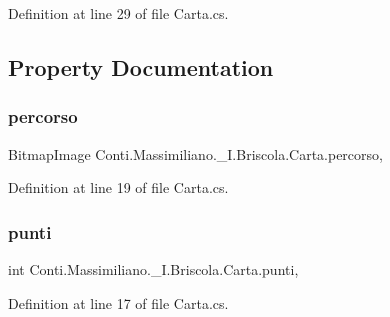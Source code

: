 Definition at line 29 of file Carta.\+cs.



\subsection{Property Documentation}
\hypertarget{class_conti_1_1_massimiliano_1_1__5_i_1_1_briscola_1_1_carta_a1320bde230f47bb50e716058ae0d11e9}{}\label{class_conti_1_1_massimiliano_1_1__5_i_1_1_briscola_1_1_carta_a1320bde230f47bb50e716058ae0d11e9} 
\subsubsection{\texorpdfstring{percorso}{percorso}}
{\footnotesize\ttfamily Bitmap\+Image Conti.\+Massimiliano.\+\_\+I.\+Briscola.\+Carta.\+percorso\hspace{0.3cm}{\ttfamily [get]}, {\ttfamily [set]}}



Definition at line 19 of file Carta.\+cs.

\hypertarget{class_conti_1_1_massimiliano_1_1__5_i_1_1_briscola_1_1_carta_a981be65d4a041ea1fc8c1c107657e355}{}\label{class_conti_1_1_massimiliano_1_1__5_i_1_1_briscola_1_1_carta_a981be65d4a041ea1fc8c1c107657e355} 
\subsubsection{\texorpdfstring{punti}{punti}}
{\footnotesize\ttfamily int Conti.\+Massimiliano.\+\_\+I.\+Briscola.\+Carta.\+punti\hspace{0.3cm}{\ttfamily [get]}, {\ttfamily [set]}}



Definition at line 17 of file Carta.\+cs.

\hypertarget{class_conti_1_1_massimiliano_1_1__5_i_1_1_briscola_1_1_carta_a742f5a2176e22c8550100b98bbbf265b}{}\label{class_conti_1_1_massimiliano_1_1__5_i_1_1_briscola_1_1_carta_a742f5a2176e22c8550100b98bbbf265b} 
